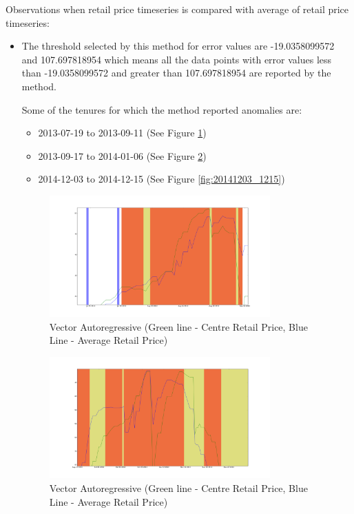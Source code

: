 \documentclass[a4paper,10pt]{report}
\begin{document}
		Observations when retail price timeseries is compared with average of retail price timeseries: 
		
		\begin{itemize}
			\item The threshold selected by this method for error values are -19.0358099572 and 107.697818954 which means all the data points with error values less than -19.0358099572 and greater than 107.697818954 are reported by the method.
			
			Some of the tenures for which the method reported anomalies are:
			
			\begin{itemize}
				\item 2013-07-19 to 2013-09-11 (See Figure \ref{fig:20130719_0911})
				\item 2013-09-17 to 2014-01-06 (See Figure \ref{fig:20130917_0106})
				\item 2014-12-03 to 2014-12-15 (See Figure \ref{fig:20141203_1215})
			\end{itemize}
			\begin{figure}[H]
		    	\centering
  		    	\includegraphics[width=0.8\textwidth]{graphs/20130719_0911.png}
		    	\caption{Vector Autoregressive (Green line - Centre Retail Price, Blue Line - Average Retail Price)}
		    	\label{fig:20130719_0911}
			\end{figure}
			
			\begin{figure}[H]
		    	\centering
  		    	\includegraphics[width=0.8\textwidth]{graphs/20130917_0106.png}
		    	\caption{Vector Autoregressive (Green line - Centre Retail Price, Blue Line - Average Retail Price)}
		    	\label{fig:20130917_0106}
			\end{figure}


\end{itemize}
\end{document}
